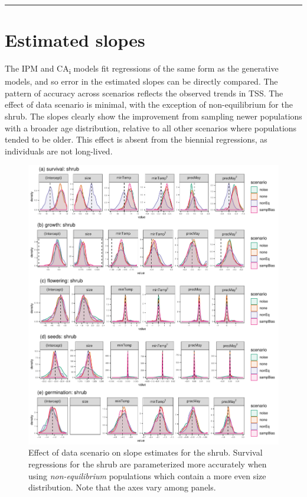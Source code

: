 \documentclass[]{article}
\begin{document}
\begin{center}\rule{0.5\linewidth}{\linethickness}\end{center}

\newpage
\section{Estimated slopes}

The IPM and CA\textsubscript{i} models fit regressions of the same form
as the generative models, and so error in the estimated slopes can be
directly compared. The pattern of accuracy across scenarios reflects the
observed trends in TSS. The effect of data scenario is minimal, with the
exception of non-equilibrium for the shrub. The slopes clearly show the
improvement from sampling newer populations with a broader age
distribution, relative to all other scenarios where populations tended
to be older. This effect is absent from the biennial regressions, as
individuals are not long-lived.

\begin{figure}
    \centering\includegraphics[width=\linewidth]{../../figs/diag/slope_dens_shrub.pdf}
    \caption{\label{fig:slopesShrub} Effect of data scenario on slope estimates for the shrub. Survival regressions for the shrub are parameterized more accurately when using \emph{non-equilibrium} populations which contain a more even size distribution. Note that the axes vary among panels.}
\end{figure}
\end{document}

